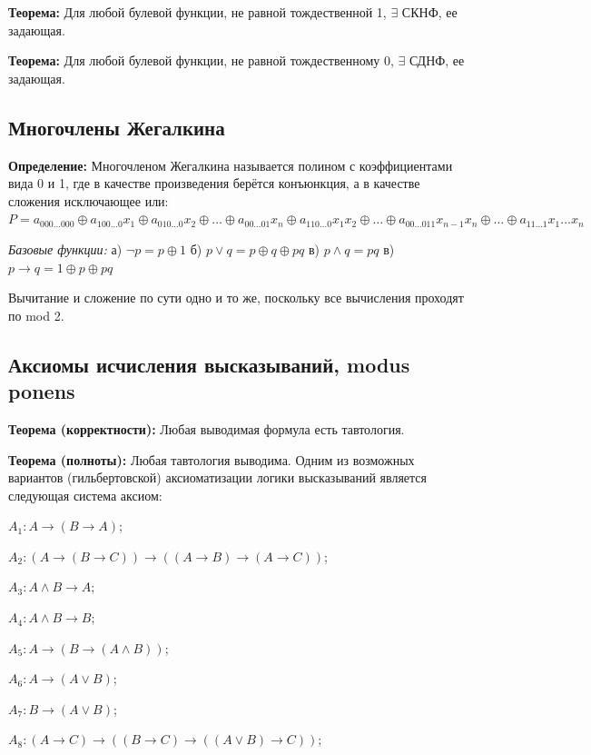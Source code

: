 \textbf{Теорема:} Для любой булевой функции, не равной тождественной 1, $\exists$ СКНФ, ее задающая.

\textbf{Теорема:} Для любой булевой функции, не равной тождественному 0, $\exists$ СДНФ, ее задающая.

\subsection{Многочлены Жегалкина}

\textbf{Определение:} Многочленом Жегалкина называется полином с коэффициентами вида 0 и 1, где в качестве произведения берётся конъюнкция, а в качестве сложения исключающее или: $P=a_{000\dots000}\oplus a_{100…0}x_1\oplus a_{010\dots0}x_2\oplus\dots\oplus a_{00…01}x_n \oplus a_{110\dots0}x_1x_2\oplus\dots\oplus a_{00\dots011}x_{n-1}x_n\oplus\dots\oplus a_{11\dots1}x_1\dots x_n$
\par \textit{Базовые функции:} а) $\neg p = p \oplus 1$ \quad б) $p\lor q = p \oplus q \oplus pq$ \newline \hangindent=4.25cm в) $p\land q = pq$ \quad в) $p\to q = 1 \oplus p \oplus pq$

Вычитание и сложение по сути одно и то же, поскольку все вычисления проходят по mod 2.


\subsection{Аксиомы исчисления высказываний, modus ponens}
\textbf{Теорема (корректности):} Любая выводимая формула есть тавтология.

\textbf{Теорема (полноты):} Любая тавтология выводима.
\newline Одним из возможных вариантов (гильбертовской) аксиоматизации логики высказываний является следующая система аксиом:

$A_{1}:A\rightarrow (B\rightarrow A)$;

$A_{2}:(A\rightarrow (B\rightarrow C))\rightarrow ((A\rightarrow B)\rightarrow (A\rightarrow C))$;

$A_{3}:A\wedge B\rightarrow A$;

$A_{4}:A\wedge B\rightarrow B$;

$A_{5}:A\rightarrow (B\rightarrow (A\wedge B))$;

$A_{6}:A\rightarrow (A\vee B)$;

$A_{7}:B\rightarrow (A\vee B)$;

$A_{8}:(A\rightarrow C)\rightarrow ((B\rightarrow C)\rightarrow ((A\vee B)\rightarrow C))$;

